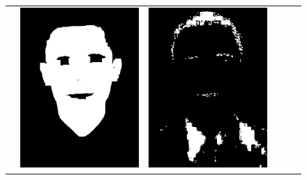 \documentclass[journal,onecolumn]{IEEEtran}
\begin{document}
\begin{figure}[htb]
{\begin{tabular}{cccccc}
&

	\includegraphics[scale=0.3]{images/skinQuantization.png}

&

	\includegraphics[scale=0.3]{images/hairQuantization.png}


\end{tabular}}
\end{figure}
\end{document}
